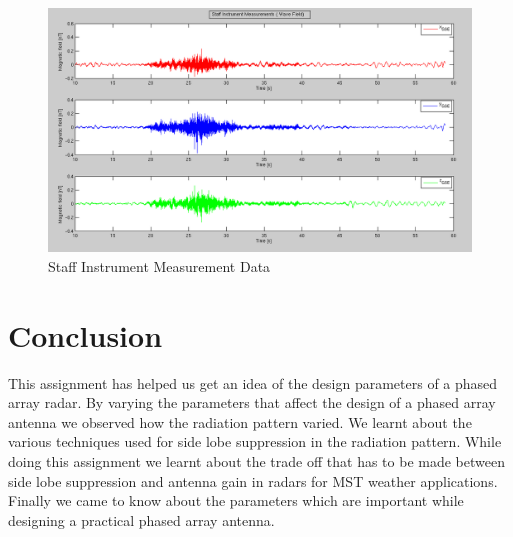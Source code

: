 \documentclass{article}
\begin{document}
\begin{figure}[htb]
\centering
\includegraphics[width=\textwidth]{Figures/Staff_measurement.png}
\caption{Staff Instrument Measurement Data}
\label{fig:Staff}
\end{figure}



\section{Conclusion}

This assignment has helped us get an idea of the design parameters of a phased array radar.
By varying the parameters that affect the design of a phased array antenna we observed how the radiation pattern varied. We learnt about the various techniques used for side lobe suppression in the radiation pattern. While doing this assignment we learnt about the trade off that has to be made between side lobe suppression and antenna gain in radars for MST weather applications. Finally we came to know about the parameters which are important while designing a practical phased array antenna.
\end{document}
